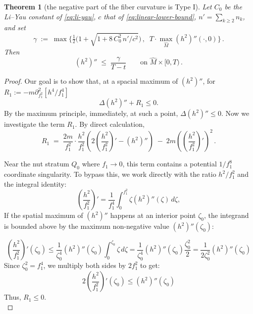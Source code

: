 \documentclass[11pt]{amsart}
\theoremstyle{plain}
\numberwithin{equation}{section}
\newtheorem{theorem}{Theorem}[section]
\theoremstyle{definition}
\theoremstyle{remark}
\begin{document}
\begin{theorem}[the negative part of the fiber curvature is Type I]\label{thm:h2pp-upper-bound}
	Let $C_0$ be the Li--Yau constant of \eqref{eq:li-yau}, $c$ that of \eqref{eq:linear-lower-bound}, $n' = \sum_{k \geq 2} n_k$, and set
	\[
	\gamma \;:=\; \max \Big\{ \tfrac{1}{2} \Big( 1 + \sqrt{ 1 + 8\, C_0^2\, n' / c^2 } \Big) \,,\;\; T \cdot \max_{\widehat{M}} ( h^2 )'' ( \cdot, 0 ) \Big\} \,.
	\]
	Then
	\begin{equation}\label{eq:h2pp-upper-bound}
		( h^2 )'' \;\leq\; \frac{\gamma}{T - t} \qquad \text{on } \widehat{M} \times [ 0, T ) \,.
	\end{equation}
	
\end{theorem}

\begin{proof}
	Our goal is to show that, at a spacial maximum of $(h^2)''$, for $R_1 := -m \partial^2_{f_1^2}[ h^4/f_1^4 ]$
	\[\Delta(h^2)''+R_1\leq 0. \]
	By the maximum principle, immediately, at such a point, $\Delta(h^2)''\leq 0$. Now we investigate the term $R_1$. By direct calculation,
	\[
	R_1 \;=\; \frac{2 m}{f_1^2} \cdot \frac{h^2}{f_1^2} \left( 2 \left( \frac{h^2}{f_1^2} \right)' - ( h^2 )'' \right) \;-\; 2 m \left( \left( \frac{h^2}{f_1^2} \right)' \right)^2 \,.
	\]
 
	
	Near the nut stratum $Q_0$ where $f_1 \to 0$, this term contains a potential $1/f_1^8$ coordinate singularity. To bypass this, we work directly with the ratio $h^2/f_1^2$ and the integral identity:
	\begin{equation}
		\left( \frac{h^2}{f_1^2} \right)' = \frac{1}{f_1^4} \int_0^{f_1^2} \zeta (h^2)''(\zeta) \, d\zeta,
	\end{equation}
 If the spatial maximum of $(h^2)''$ happens at an interior point  $\zeta_0$, the integrand is bounded above by the maximum non-negative value $(h^2)''(\zeta_0)$: 
 
 $$\left( \frac{h^2}{f_1^2} \right)'(\zeta_0) \le \frac{1}{\zeta_0^4} (h^2)''(\zeta_0) \int_0^{\zeta_0} \zeta \, d\zeta = \frac{1}{\zeta_0^4} (h^2)''(\zeta_0) \frac{\zeta_0^2}{2} = \frac{1}{2\zeta_0^2} (h^2)''(\zeta_0)$$
 Since $\zeta_0^2 = f_1^4$, we multiply both sides by $2 f_1^2$ to get: $$2 \left( \frac{h^2}{f_1^2} \right)'(\zeta_0) \le (h^2)''(\zeta_0)$$
 Thus, $R_1\leq 0$. \\
 

\end{proof}
\end{document}
